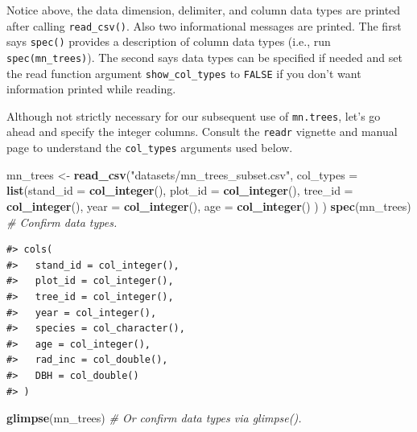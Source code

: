 \documentclass[
  11pt,
]{krantz}
\newenvironment{Shaded}{\begin{snugshade}}{\end{snugshade}}
\newcommand{\CommentTok}[1]{\textcolor[rgb]{0.56,0.35,0.01}{\textit{#1}}}
\newcommand{\DataTypeTok}[1]{\textcolor[rgb]{0.13,0.29,0.53}{#1}}
\newcommand{\KeywordTok}[1]{\textcolor[rgb]{0.13,0.29,0.53}{\textbf{#1}}}
\newcommand{\NormalTok}[1]{#1}
\newcommand{\StringTok}[1]{\textcolor[rgb]{0.31,0.60,0.02}{#1}}
\theoremstyle{definition}
\theoremstyle{definition}
\theoremstyle{definition}
\theoremstyle{definition}
\theoremstyle{remark}
\begin{document}
Notice above, the data dimension, delimiter, and column data types are printed after calling \texttt{read\_csv()}. Also two informational messages are printed. The first says \texttt{spec()} provides a description of column data types (i.e., run \texttt{spec(mn\_trees)}). The second says data types can be specified if needed and set the read function argument \texttt{show\_col\_types} to \texttt{FALSE} if you don't want information printed while reading.

Although not strictly necessary for our subsequent use of \texttt{mn.trees}, let's go ahead and specify the integer columns. Consult the \texttt{readr} vignette and manual page to understand the \texttt{col\_types} arguments used below.

\begin{Shaded}
\begin{Highlighting}[]
\NormalTok{mn\_trees \textless{}{-}}\StringTok{ }\KeywordTok{read\_csv}\NormalTok{(}\StringTok{"datasets/mn\_trees\_subset.csv"}\NormalTok{,}
                     \DataTypeTok{col\_types =} \KeywordTok{list}\NormalTok{(}\DataTypeTok{stand\_id =} \KeywordTok{col\_integer}\NormalTok{(),}
                                      \DataTypeTok{plot\_id =} \KeywordTok{col\_integer}\NormalTok{(),}
                                      \DataTypeTok{tree\_id =} \KeywordTok{col\_integer}\NormalTok{(),}
                                      \DataTypeTok{year =} \KeywordTok{col\_integer}\NormalTok{(),}
                                      \DataTypeTok{age =} \KeywordTok{col\_integer}\NormalTok{()}
\NormalTok{                                      )}
\NormalTok{                    )}
\KeywordTok{spec}\NormalTok{(mn\_trees) }\CommentTok{\# Confirm data types.}
\end{Highlighting}
\end{Shaded}

\begin{verbatim}
#> cols(
#>   stand_id = col_integer(),
#>   plot_id = col_integer(),
#>   tree_id = col_integer(),
#>   year = col_integer(),
#>   species = col_character(),
#>   age = col_integer(),
#>   rad_inc = col_double(),
#>   DBH = col_double()
#> )
\end{verbatim}

\begin{Shaded}
\begin{Highlighting}[]
\KeywordTok{glimpse}\NormalTok{(mn\_trees) }\CommentTok{\# Or confirm data types via glimpse().}
\end{Highlighting}
\end{Shaded}
\end{document}
